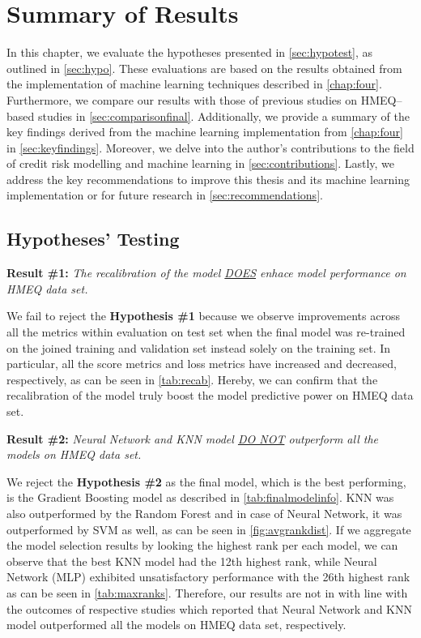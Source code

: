 \chapter{Summary of Results}
\label{chap:five}
In this chapter, we evaluate the hypotheses presented in \autoref{sec:hypotest}, as outlined in \autoref{sec:hypo}.
These evaluations are based on the results obtained from the implementation of machine learning techniques described in \autoref{chap:four}. 
Furthermore, we compare our results with those of previous studies on HMEQ--based studies \citep{serkan2021bagging,zurada2014classification} in \autoref{sec:comparisonfinal}.
Additionally, we provide a summary of the key findings derived from the machine learning implementation from \autoref{chap:four} in  \autoref{sec:keyfindings}. 
Moreover, we delve into the author's contributions to the field of credit risk modelling and machine learning in \autoref{sec:contributions}.
Lastly, we address the key recommendations to improve this thesis and its machine learning implementation or for future research in \autoref{sec:recommendations}.

\section{Hypotheses' Testing}
\label{sec:hypotest}
\noindent \textbf{Result \#1:} \textit{The recalibration of the model \underline{DOES} enhace model performance on HMEQ data set.}

We fail to reject the \textbf{Hypothesis \#1} because we observe improvements across all the metrics within evaluation on test set when the final model was re-trained on the joined training and validation set instead solely on the training set.
In particular, all the score metrics and loss metrics have increased and decreased, respectively, as can be seen in \autoref{tab:recab}. Hereby, we can confirm that the recalibration of the model truly boost the model predictive power on HMEQ data set.

\vspace{0.3cm}

\noindent \textbf{Result \#2:} \textit{Neural Network and KNN model \underline{DO NOT} outperform all the models on HMEQ data set.}

We reject the \textbf{Hypothesis \#2} as the final model, which is the best performing, is the Gradient Boosting model as described in \autoref{tab:finalmodelinfo}.
KNN was also outperformed by the Random Forest and in case of Neural Network, it was outperformed by SVM as well, as can be seen in \autoref{fig:avgrankdist}.
If we aggregate the model selection results by looking the highest rank per each model, we can observe that the best KNN model had the 12th highest rank, while Neural Network (MLP) exhibited unsatisfactory performance with the 26th highest rank as can be seen in \autoref{tab:maxranks}.
Therefore, our results are not in with line with the outcomes of respective studies \citep{serkan2021bagging,zurada2014classification} which reported that Neural Network and KNN model outperformed all the models on HMEQ data set, respectively.

